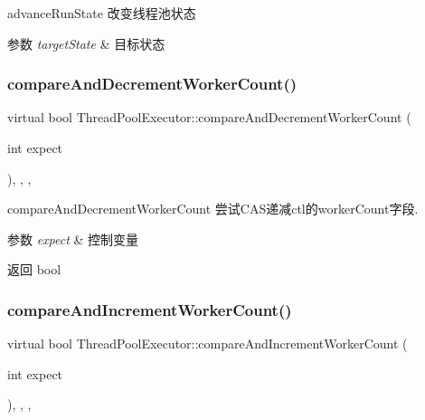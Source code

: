 advance\+Run\+State 改变线程池状态 


\begin{DoxyParams}{参数}
{\em target\+State} & 目标状态 \\
\hline
\end{DoxyParams}
\mbox{\label{classThreadPoolExecutor_ac40053b88cd669526a0a6225b5e1a86e}} 
\subsubsection{\texorpdfstring{compare\+And\+Decrement\+Worker\+Count()}{compareAndDecrementWorkerCount()}}
{\footnotesize\ttfamily virtual bool Thread\+Pool\+Executor\+::compare\+And\+Decrement\+Worker\+Count (\begin{DoxyParamCaption}\item[{int}]{expect }\end{DoxyParamCaption})\hspace{0.3cm}{\ttfamily [inline]}, {\ttfamily [final]}, {\ttfamily [protected]}, {\ttfamily [virtual]}}



compare\+And\+Decrement\+Worker\+Count 尝试\+C\+A\+S递减ctl的worker\+Count字段. 


\begin{DoxyParams}{参数}
{\em expect} & 控制变量\\
\hline
\end{DoxyParams}
\begin{DoxyReturn}{返回}
bool 
\end{DoxyReturn}
\mbox{\label{classThreadPoolExecutor_ac1bcafe65f800aeb9feade5f31b64fde}} 
\subsubsection{\texorpdfstring{compare\+And\+Increment\+Worker\+Count()}{compareAndIncrementWorkerCount()}}
{\footnotesize\ttfamily virtual bool Thread\+Pool\+Executor\+::compare\+And\+Increment\+Worker\+Count (\begin{DoxyParamCaption}\item[{int}]{expect }\end{DoxyParamCaption})\hspace{0.3cm}{\ttfamily [inline]}, {\ttfamily [final]}, {\ttfamily [protected]}, {\ttfamily [virtual]}}




